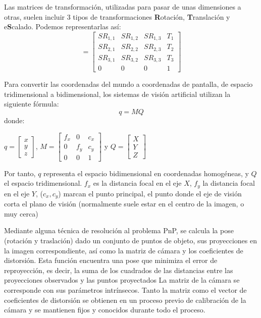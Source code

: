 Las matrices de transformación, utilizadas para pasar de unas dimensiones a otras, suelen incluir 3
tipos de transformaciones \textbf{R}otación, \textbf{T}ranslación y e\textbf{S}calado. Podemos representarlas así:
\begin{equation}
  [R|t] = \begin{bmatrix} SR_{1,1} & SR_{1,2} & SR_{1,3} & T_{1}  \\
    SR_{2,1} & SR_{2,2} & SR_{2,3} & T_{2}  \\
    SR_{3,1} & SR_{3,2} & SR_{3,3} & T_{3}  \\
    0    &     0   &     0   &  1
  \end{bmatrix}
\end{equation}

Para convertir las coordenadas del mundo a coordenadas de pantalla, de espacio tridimensional a bidimensional, los sistemas de visión artificial utilizan la siguiente fórmula:
\begin{equation}
q=MQ
\end{equation}
donde:
\begin{center}
$q=\begin{bmatrix} x \\ y \\ z \end{bmatrix}$, $M=\begin{bmatrix} f_{x} & 0 & c_{x} \\ 0 & f_{y} & c_{y} \\ 0 & 0 & 1 \end{bmatrix}$ y $Q=\begin{bmatrix} X \\ Y \\ Z \end{bmatrix}$
\end{center}

Por tanto, $q$ representa el espacio bidimensional en coordenadas homogéneas, y $Q$ el espacio tridimensional. $f_{x}$ es la distancia focal en el eje $X$, $f_{y}$ la distancia focal en el eje $Y$, ($c_{x},c_{y}$) marcan el punto principal, el punto donde el eje de visión corta el plano de visión (normalmente suele estar en el centro de la imagen, o muy cerca)

Mediante alguna técnica de resolución al problema PnP, se calcula la pose (rotación y traslación) dado un conjunto de puntos de objeto, sus proyecciones en la imagen correspondiente, así como la matriz de cámara y los coeficientes de distorsión. Esta función encuentra una pose que minimiza el error de reproyección, es decir, la suma de los cuadrados de las distancias entre las proyecciones observados y las puntos proyectados
La matriz de la cámara se corresponde con sus parámetros intrínsecos. Tanto la matriz como el vector
de coeficientes de distorsión se obtienen en un proceso previo de calibración de la cámara y se
mantienen fijos y conocidos durante todo el proceso.


